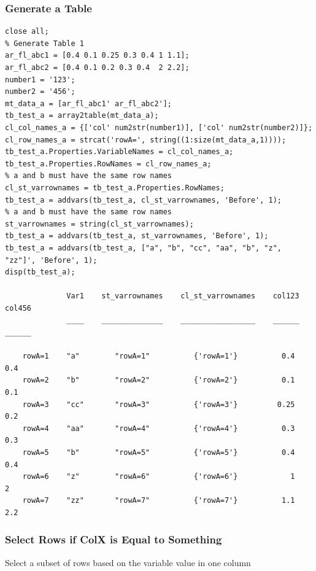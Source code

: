 \documentclass[
]{book}
\begin{document}
\hypertarget{generate-a-table}{%
\subsubsection{Generate a Table}\label{generate-a-table}}

\begin{verbatim}
close all;
% Generate Table 1
ar_fl_abc1 = [0.4 0.1 0.25 0.3 0.4 1 1.1];
ar_fl_abc2 = [0.4 0.1 0.2 0.3 0.4  2 2.2];
number1 = '123';
number2 = '456';
mt_data_a = [ar_fl_abc1' ar_fl_abc2'];
tb_test_a = array2table(mt_data_a);
cl_col_names_a = {['col' num2str(number1)], ['col' num2str(number2)]};
cl_row_names_a = strcat('rowA=', string((1:size(mt_data_a,1))));
tb_test_a.Properties.VariableNames = cl_col_names_a;
tb_test_a.Properties.RowNames = cl_row_names_a;
% a and b must have the same row names
cl_st_varrownames = tb_test_a.Properties.RowNames;
tb_test_a = addvars(tb_test_a, cl_st_varrownames, 'Before', 1);
% a and b must have the same row names
st_varrownames = string(cl_st_varrownames);
tb_test_a = addvars(tb_test_a, st_varrownames, 'Before', 1);
tb_test_a = addvars(tb_test_a, ["a", "b", "cc", "aa", "b", "z", "zz"]', 'Before', 1);
disp(tb_test_a);

              Var1    st_varrownames    cl_st_varrownames    col123    col456
              ____    ______________    _________________    ______    ______

    rowA=1    "a"        "rowA=1"          {'rowA=1'}          0.4      0.4  
    rowA=2    "b"        "rowA=2"          {'rowA=2'}          0.1      0.1  
    rowA=3    "cc"       "rowA=3"          {'rowA=3'}         0.25      0.2  
    rowA=4    "aa"       "rowA=4"          {'rowA=4'}          0.3      0.3  
    rowA=5    "b"        "rowA=5"          {'rowA=5'}          0.4      0.4  
    rowA=6    "z"        "rowA=6"          {'rowA=6'}            1        2  
    rowA=7    "zz"       "rowA=7"          {'rowA=7'}          1.1      2.2  
\end{verbatim}

\hypertarget{select-rows-if-colx-is-equal-to-something}{%
\subsubsection{Select Rows if ColX is Equal to Something}\label{select-rows-if-colx-is-equal-to-something}}

Select a subset of rows based on the variable value in one column
\end{document}
